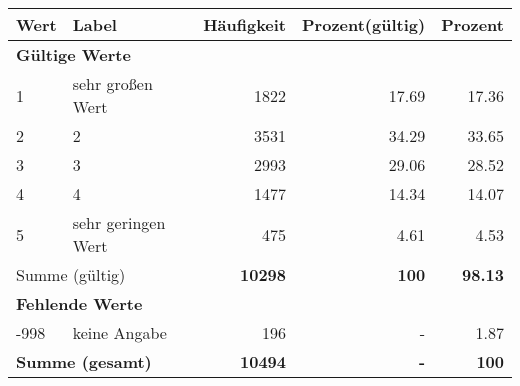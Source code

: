      \begin{longtable}{lXrrr}
     \toprule
     \textbf{Wert} & \textbf{Label} & \textbf{Häufigkeit} & \textbf{Prozent(gültig)} & \textbf{Prozent} \\
     \endhead
     \midrule
     \multicolumn{5}{l}{\textbf{Gültige Werte}}\\

     1 &
     \multicolumn{1}{X}{ sehr großen Wert   } &


       \num{1822} &
       \num[round-mode=places,round-precision=2]{17.69} &
         \num[round-mode=places,round-precision=2]{17.36} \\

     2 &
     \multicolumn{1}{X}{ 2   } &


       \num{3531} &
       \num[round-mode=places,round-precision=2]{34.29} &
         \num[round-mode=places,round-precision=2]{33.65} \\

     3 &
     \multicolumn{1}{X}{ 3   } &


       \num{2993} &
       \num[round-mode=places,round-precision=2]{29.06} &
         \num[round-mode=places,round-precision=2]{28.52} \\

     4 &
     \multicolumn{1}{X}{ 4   } &


       \num{1477} &
       \num[round-mode=places,round-precision=2]{14.34} &
         \num[round-mode=places,round-precision=2]{14.07} \\

     5 &
     \multicolumn{1}{X}{ sehr geringen Wert   } &


       \num{475} &
       \num[round-mode=places,round-precision=2]{4.61} &
         \num[round-mode=places,round-precision=2]{4.53} \\
     \midrule
     \multicolumn{2}{l}{Summe (gültig)} &
       \textbf{\num{10298}} &
     \textbf{\num{100}} &
       \textbf{\num[round-mode=places,round-precision=2]{98.13}} \\
     \multicolumn{5}{l}{\textbf{Fehlende Werte}}\\
       -998 &
       keine Angabe &
         \num{196} &
        - &
         \num[round-mode=places,round-precision=2]{1.87} \\
     \midrule
     \multicolumn{2}{l}{\textbf{Summe (gesamt)}} &
          \textbf{\num{10494}} &
        \textbf{-} &
        \textbf{\num{100}} \\
     \bottomrule
     \end{longtable}
     
